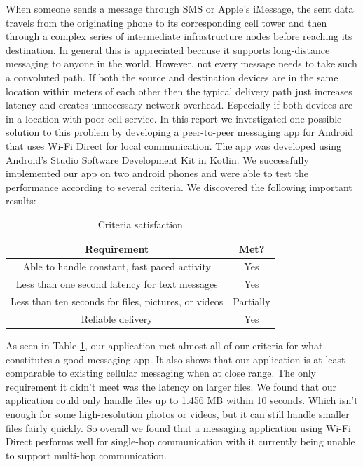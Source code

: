 \documentclass[10pt]{article}
\begin{document}
When someone sends a message through SMS or Apple's iMessage, the sent data travels from the originating phone to its corresponding cell tower and then through a complex series of intermediate infrastructure nodes before reaching its destination. In general this is appreciated because it supports long-distance messaging to anyone in the world. However, not every message needs to take such a convoluted path. If both the source and destination devices are in the same location within meters of each other then the typical delivery path just increases latency and creates unnecessary network overhead. Especially if both devices are in a location with poor cell service. In this report we investigated one possible solution to this problem by developing a peer-to-peer messaging app for Android that uses Wi-Fi Direct for local communication. The app was developed using Android’s Studio Software Development Kit in Kotlin. We successfully implemented our app on two android phones and were able to test the performance according to several criteria. We discovered the following important results:

\begin{table}
    \centering
    \begin{tabular}{|c|c|}
        \hline
        Requirement & Met?\\
        \hline \hline
        Able to handle constant, fast paced activity & Yes\\
        \hline
        Less than one second latency for text messages & Yes\\
        \hline
        Less than ten seconds for files, pictures, or videos & Partially\\
        \hline
        Reliable delivery & Yes\\
        \hline
    \end{tabular}
    \caption{Criteria satisfaction}
    \label{tab:conclusions}
\end{table}

As seen in Table \ref{tab:conclusions}, our application met almost all of our criteria for what constitutes a good messaging app. It also shows that our application is at least comparable to existing cellular messaging when at close range. The only requirement it didn't meet was the latency on larger files. We found that our application could only handle files up to 1.456 MB within 10 seconds. Which isn't enough for some high-resolution photos or videos, but it can still handle smaller files fairly quickly. So overall we found that a messaging application using Wi-Fi Direct performs well for single-hop communication with it currently being unable to support multi-hop communication.

\renewcommand{\refname} {\section{References}}

{}
\end{document}
